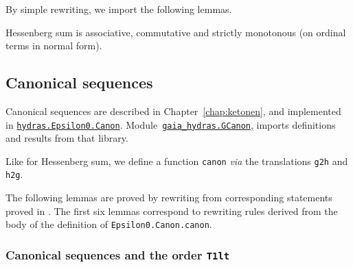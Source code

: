 \vspace{4pt} 
\noindent


By simple rewriting, we import the following lemmas.




Hessenberg sum is associative, commutative and strictly monotonous (on ordinal terms in normal form).


\subsection{Canonical sequences}
\label{sect:gcanon}

Canonical sequences are described in Chapter~\vref{chap:ketonen}, and implemented in
\href{../theories/html/hydras.Epsilon0.Canon.html}%
{\texttt{hydras.Epsilon0.Canon}}.
Module~\href{../theories/html/gaia_hydras.GCanon.html}%
{\texttt{gaia\_hydras.GCanon}}, imports definitions and results from that library.


Like for Hessenberg sum, we define a function \texttt{canon}
\emph{via} the
translations \texttt{g2h} and \texttt{h2g}.


The following lemmas are proved by rewriting from corresponding statements proved in \HydrasLib. The first six lemmas correspond to rewriting rules derived from the body of the definition of \texttt{Epsilon0.Canon.canon}.





\subsubsection{Canonical sequences and the order \texttt{T1lt}}

